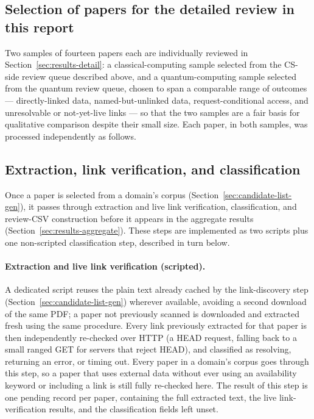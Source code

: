 \subsection{Selection of papers for the detailed review in this report}
Two samples of fourteen papers each are individually reviewed in
Section~\ref{sec:results-detail}: a classical-computing sample selected from the CS-side
review queue described above, and a quantum-computing sample selected from the
quantum review queue, chosen to span a comparable range of outcomes ---
directly-linked data, named-but-unlinked data, request-conditional access, and
unresolvable or not-yet-live links --- so that the two samples are a fair basis for
qualitative comparison despite their small size. Each paper, in both samples, was
processed independently as follows.

\subsection{Extraction, link verification, and classification}
\label{sec:extraction-classification}

Once a paper is selected from a domain's corpus (Section~\ref{sec:candidate-list-gen}),
it passes through extraction and live link verification, classification, and
review-CSV construction before it appears in the aggregate results
(Section~\ref{sec:results-aggregate}). These steps are implemented as two scripts plus
one non-scripted classification step, described in turn below.

\paragraph{Extraction and live link verification (scripted).} A dedicated
script reuses the plain text already cached by the link-discovery step
(Section~\ref{sec:candidate-list-gen}) wherever available, avoiding a second download
of the same PDF; a paper not previously scanned is downloaded and extracted fresh using
the same procedure. Every link previously extracted for that paper is then
independently re-checked over HTTP (a HEAD request, falling back to a small ranged GET
for servers that reject HEAD), and classified as resolving, returning an error, or
timing out. Every paper in a domain's corpus goes through this step, so a paper that
uses external data without ever using an availability keyword or including a link is
still fully re-checked here. The
result of this step is one pending record per paper, containing the full extracted
text, the live link-verification results, and the classification fields left unset.

